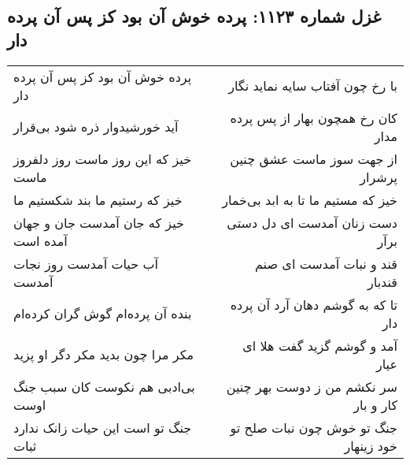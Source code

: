 \begin{center}
\section*{غزل شماره ۱۱۲۳: پرده خوش آن بود کز پس آن پرده دار}
\label{sec:1123}
\begin{longtable}{l p{0.5cm} r}
پرده خوش آن بود کز پس آن پرده دار
&&
با رخ چون آفتاب سایه نماید نگار
\\
آید خورشیدوار ذره شود بی‌قرار
&&
کان رخ همچون بهار از پس پرده مدار
\\
خیز که این روز ماست روز دلفروز ماست
&&
از جهت سوز ماست عشق چنین پرشرار
\\
خیز که رستیم ما بند شکستیم ما
&&
خیز که مستیم ما تا به ابد بی‌خمار
\\
خیز که جان آمدست جان و جهان آمده است
&&
دست زنان آمدست ای دل دستی برآر
\\
آب حیات آمدست روز نجات آمدست
&&
قند و نبات آمدست ای صنم قندبار
\\
بنده آن پرده‌ام گوش گران کرده‌ام
&&
تا که به گوشم دهان آرد آن پرده دار
\\
مکر مرا چون بدید مکر دگر او پزید
&&
آمد و گوشم گزید گفت هلا ای عیار
\\
بی‌ادبی هم نکوست کان سبب جنگ اوست
&&
سر نکشم من ز دوست بهر چنین کار و بار
\\
جنگ تو است این حیات زانک ندارد ثبات
&&
جنگ تو خوش چون نبات صلح تو خود زینهار
\\
\end{longtable}
\end{center}
